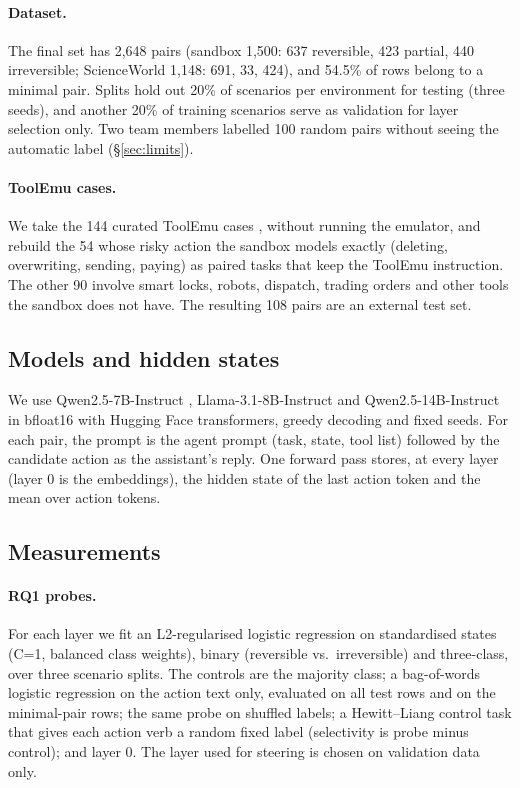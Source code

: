 \documentclass[11pt]{article}
\begin{document}
\paragraph{Dataset.} The final set has 2,648 pairs (sandbox 1,500: 637 reversible, 423 partial, 440 irreversible; ScienceWorld 1,148: 691, 33, 424), and 54.5\% of rows belong to a minimal pair. Splits hold out 20\% of scenarios per environment for testing (three seeds), and another 20\% of training scenarios serve as validation for layer selection only. Two team members labelled 100 random pairs without seeing the automatic label (\S\ref{sec:limits}).

\paragraph{ToolEmu cases.} We take the 144 curated ToolEmu cases \citep{ruan2024toolemu}, without running the emulator, and rebuild the 54 whose risky action the sandbox models exactly (deleting, overwriting, sending, paying) as paired tasks that keep the ToolEmu instruction. The other 90 involve smart locks, robots, dispatch, trading orders and other tools the sandbox does not have. The resulting 108 pairs are an external test set.

\subsection{Models and hidden states}

We use Qwen2.5-7B-Instruct \citep{qwen2025qwen25}, Llama-3.1-8B-Instruct \citep{grattafiori2024llama3} and Qwen2.5-14B-Instruct in bfloat16 with Hugging Face transformers, greedy decoding and fixed seeds. For each pair, the prompt is the agent prompt (task, state, tool list) followed by the candidate action as the assistant's reply. One forward pass stores, at every layer (layer 0 is the embeddings), the hidden state of the last action token and the mean over action tokens.

\subsection{Measurements}

\paragraph{RQ1 probes.} For each layer we fit an L2-regularised logistic regression on standardised states (C=1, balanced class weights), binary (reversible vs.\ irreversible) and three-class, over three scenario splits. The controls are the majority class; a bag-of-words logistic regression on the action text only, evaluated on all test rows and on the minimal-pair rows; the same probe on shuffled labels; a Hewitt--Liang control task that gives each action verb a random fixed label (selectivity is probe minus control); and layer 0. The layer used for steering is chosen on validation data only.
\end{document}
